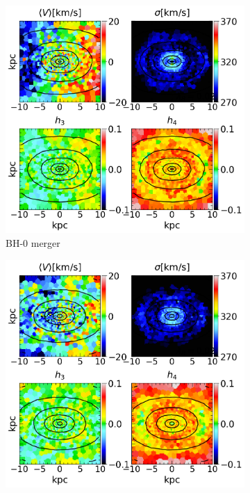 \documentclass[english, oneside]{HYgradu}
\begin{document}
\begin{figure}
	\centering
	\begin{subfigure}[b]{0.49\textwidth}
		\includegraphics[width=\textwidth]{BH_0.png}
		\caption{BH-0 merger}
	\end{subfigure}
	\begin{subfigure}[b]{0.49\textwidth}
		\includegraphics[width=\textwidth]{BH_1.png}

\end{subfigure}
\end{figure}
\end{document}
